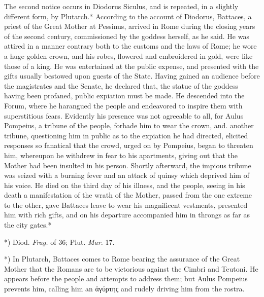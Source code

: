 \documentclass[a4paper, 11pt, oneside, polutonikogreek, english]{article}
\begin{document}
The second notice occurs in Diodorus Siculus, and is repeated, in a slightly different form, by Plutarch.* According to the account of Diodorus, Battaces, a priest of the Great Mother at Pessinus, arrived in Rome during the closing years of the second century, commissioned by the goddess herself, as he said. He was attired in a manner contrary both to the customs and the laws of Rome; he wore a huge golden crown, and his robes, flowered and embroidered in gold, were like those of a king. He was entertained at the public expense, and presented with the gifts usually bestowed upon guests of the State. Having gained an audience before the magistrates and the Senate, he declared that, the statue of the goddess having been profaned, public expiation must be made. He descended into the Forum, where he harangued the people and endeavored to inspire them with superstitious fears. Evidently his presence was not agreeable to all, for Aulus Pompeius, a tribune of the people, forbade him to wear the crown, and. another tribune, questioning him in public as to the expiation he had directed, elicited responses so fanatical that the crowd, urged on by Pompeius, began to threaten him, whereupon he withdrew in fear to his apartments, giving out that the Mother had been insulted in his person. Shortly afterward, the impious tribune was seized with a burning fever and an attack of quinsy which deprived him of his voice. He died on the third day of his illness, and the people, seeing in his death a manifestation of the wrath of the Mother, passed from the one extreme to the other, gave Battaces leave to wear his magnificent vestments, presented him with rich gifts, and on his departure accompanied him in throngs as far as the city gates.*

*) Diod. \emph{Frag.} of 36; Plut. \emph{Mar.} 17.

*) In Plutarch, Battaces comes to Rome bearing the assurance of the Great Mother that the Romans are to be victorious against the Cimbri and Teutoni. He appears before the people and attempts to address them; but Aulus Pompeius prevents him, calling him an ἀγύρτης and rudely driving him from the rostra.
\end{document}
